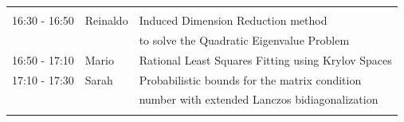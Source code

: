 \documentclass{beamer}
\begin{document}
\begin{frame}
\begin{table}[h]
\begin{tabular}{lll}
\hline \\ [-1.5ex]
16:30 - 16:50 & Reinaldo & Induced Dimension Reduction method \\
            & & to solve the Quadratic Eigenvalue Problem \\ [0.5ex]
16:50 - 17:10 & Mario & Rational Least Squares Fitting using Krylov Spaces\\ [0.5ex]
17:10 - 17:30 & Sarah & Probabilistic bounds for the matrix condition  \\
                    & & number with extended Lanczos bidiagonalization\\ [0.5ex]
\hline \\ [-1.5ex]
\end{tabular}
\end{table}
\end{frame}
\end{document}

